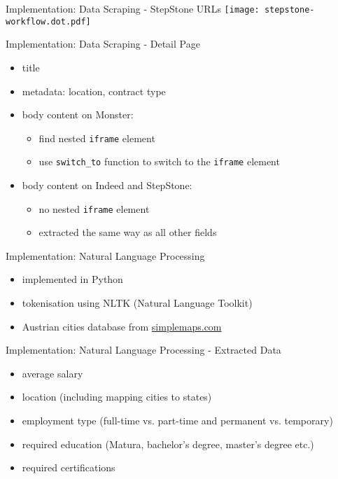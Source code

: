 \documentclass[aspectratio=169]{beamer}
\begin{document}
  \begin{frame}{Implementation: Data Scraping - StepStone URLs}
    \centering
    \texttt{[image: stepstone-workflow.dot.pdf]}
  \end{frame}

  \begin{frame}{Implementation: Data Scraping - Detail Page}
    \begin{itemize}
      \item title
      \item metadata: location, contract type
      \item body content on Monster:
        \begin{itemize}
          \item find nested \texttt{iframe} element
          \item use \texttt{switch\_to} function to switch to the \texttt{iframe} element
        \end{itemize}
      \item body content on Indeed and StepStone:
        \begin{itemize}
          \item no nested \texttt{iframe} element
          \item extracted the same way as all other fields
        \end{itemize}
    \end{itemize}
  \end{frame}

  \begin{frame}{Implementation: Natural Language Processing}
    \begin{itemize}
      \item implemented in Python
      \item tokenisation using NLTK (Natural Language Toolkit)
      \item Austrian cities database from \href{https://simplemaps.com}{simplemaps.com}
    \end{itemize}
  \end{frame}

  \begin{frame}{Implementation: Natural Language Processing - Extracted Data}
    \begin{itemize}
      \item average salary
      \item location (including mapping cities to states)
      \item employment type (full-time vs. part-time and permanent vs. temporary)
      \item required education (Matura, bachelor's degree, master's degree etc.)
      \item required certifications
    \end{itemize}
  \end{frame}
\end{document}
